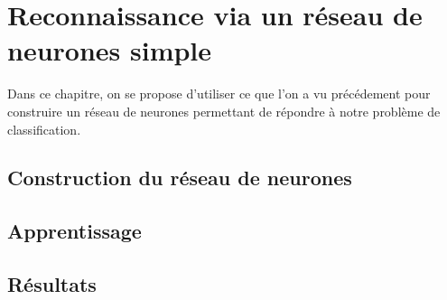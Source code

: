 
\chapter{Reconnaissance via un réseau de neurones simple}



Dans ce chapitre, on se propose d'utiliser ce que l'on a vu 
précédement pour construire un réseau de neurones permettant 
de répondre à notre problème de classification.


\section{Construction du réseau de neurones}



\section{Apprentissage}



\section{Résultats}



